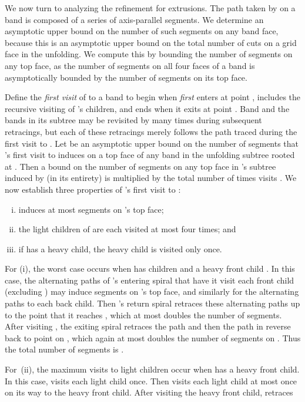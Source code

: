 \documentclass[11pt]{article}
\begin{document}
We now turn to analyzing the refinement for extrusions. The path taken by 
on a band is composed of a series of
axis-parallel segments.
We determine an asymptotic upper bound on the number
of such segments on any band face,
because this is an asymptotic upper bound on the total
number of cuts on a grid face in the unfolding. We compute this by bounding the number
of segments on any top face, as the number of segments on all four faces of a
band is asymptotically bounded by the number of segments on its top face.

Define the {\em first visit} of  to a band  to begin
when  {\em first} enters  at point , includes the recursive visiting of
's children, and ends when it exits  at point .
Band
 and the bands in its subtree may be revisited by  many times during
subsequent retracings, but each of these retracings merely follows the path traced
during the first visit to .
Let  be an asymptotic upper bound on the number of segments that
's first visit to 
induces on a top face of any band in the unfolding subtree rooted at .
Then a bound on the number of
 segments on any top face in 's subtree induced by  (in its entirety) is 
multiplied by the total number of times  visits .
We now establish three properties of 's first visit to :
\begin{enumerate}[(i)]
\item  induces at most   segments on 's top face;
\item the light children of  are each visited at most four times; and
\item if  has a heavy child, the heavy child is visited only once.
\end{enumerate}

For (i), the worst case occurs when
 has  children and a heavy front child .
In this case, the
alternating paths of 's entering spiral 
that have it visit each front child (excluding ) may induce
  segments on 's top face, and similarly for the alternating paths to each
back child.
Then 's return spiral  retraces these alternating paths up to the point
that it reaches , which
at most doubles the number of  segments.
After visiting  ,
the exiting spiral  retraces the path  and then the path
 in reverse back to point  on , which again
at most doubles the number of  segments
on . Thus the total number of  segments is .

For~(ii), the maximum visits to light children occur when
 has a heavy front child. In this case,
 visits each light child once.
Then 
visits each light child at most once on its way to the heavy front child. After visiting the heavy
front child,  retraces
\end{document}

